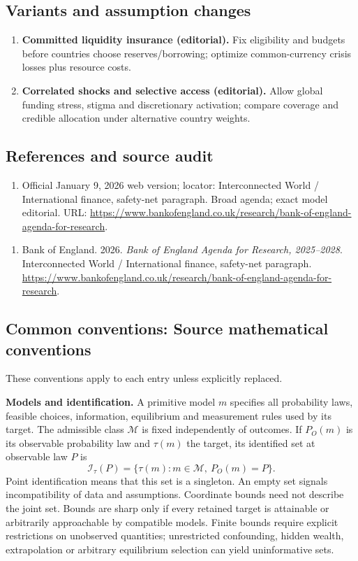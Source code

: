 \documentclass[11pt,a4paper]{article}
\begin{document}
\subsection*{Variants and assumption changes}
\begin{enumerate}
\item \textbf{Committed liquidity insurance (editorial).} Fix eligibility and budgets before countries choose reserves/borrowing; optimize common-currency crisis losses plus resource costs.
\item \textbf{Correlated shocks and selective access (editorial).} Allow global funding stress, stigma and discretionary activation; compare coverage and credible allocation under alternative country weights.
\end{enumerate}
\subsection*{References and source audit}
\begin{enumerate}
\item Official January 9, 2026 web version; locator: Interconnected World / International finance, safety-net paragraph. Broad agenda; exact model editorial. URL: \url{https://www.bankofengland.co.uk/research/bank-of-england-agenda-for-research}.
\end{enumerate}
\begin{enumerate}\raggedright
\item\hypertarget{definitions:source:30007621:1}{} Bank of England. 2026. \emph{Bank of England Agenda for Research, 2025–2028}. Interconnected World / International finance, safety-net paragraph.
\url{https://www.bankofengland.co.uk/research/bank-of-england-agenda-for-research}.
\end{enumerate}

\subsection*{Common conventions: Source mathematical conventions}

These conventions apply to each entry unless explicitly replaced.

\textbf{Models and identification.} A primitive model \(m\) specifies all probability laws, feasible choices, information, equilibrium and measurement rules used by its target. The admissible class \(\mathcal M\) is fixed independently of outcomes. If \(P_O(m)\) is its observable probability law and \(\tau(m)\) the target, its identified set at observable law \(P\) is
\[
 \mathcal I_\tau(P)=\{\tau(m):m\in\mathcal M,\ P_O(m)=P\}.
\]
Point identification means that this set is a singleton. An empty set signals incompatibility of data and assumptions. Coordinate bounds need not describe the joint set. Bounds are sharp only if every retained target is attainable or arbitrarily approachable by compatible models. Finite bounds require explicit restrictions on unobserved quantities; unrestricted confounding, hidden wealth, extrapolation or arbitrary equilibrium selection can yield uninformative sets.
\end{document}
